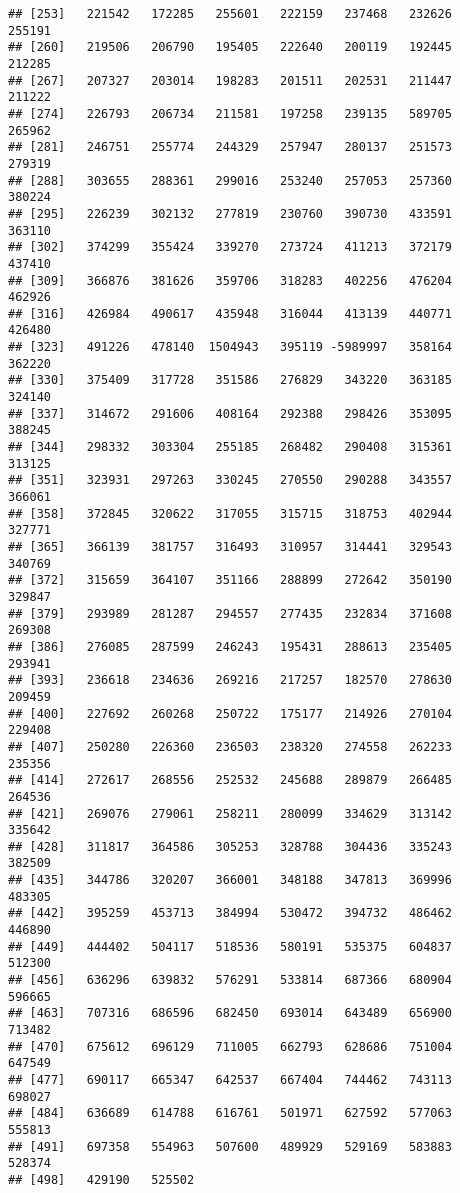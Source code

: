 \documentclass[]{article}
\begin{document}
\begin{verbatim}
## [253]   221542   172285   255601   222159   237468   232626   255191
## [260]   219506   206790   195405   222640   200119   192445   212285
## [267]   207327   203014   198283   201511   202531   211447   211222
## [274]   226793   206734   211581   197258   239135   589705   265962
## [281]   246751   255774   244329   257947   280137   251573   279319
## [288]   303655   288361   299016   253240   257053   257360   380224
## [295]   226239   302132   277819   230760   390730   433591   363110
## [302]   374299   355424   339270   273724   411213   372179   437410
## [309]   366876   381626   359706   318283   402256   476204   462926
## [316]   426984   490617   435948   316044   413139   440771   426480
## [323]   491226   478140  1504943   395119 -5989997   358164   362220
## [330]   375409   317728   351586   276829   343220   363185   324140
## [337]   314672   291606   408164   292388   298426   353095   388245
## [344]   298332   303304   255185   268482   290408   315361   313125
## [351]   323931   297263   330245   270550   290288   343557   366061
## [358]   372845   320622   317055   315715   318753   402944   327771
## [365]   366139   381757   316493   310957   314441   329543   340769
## [372]   315659   364107   351166   288899   272642   350190   329847
## [379]   293989   281287   294557   277435   232834   371608   269308
## [386]   276085   287599   246243   195431   288613   235405   293941
## [393]   236618   234636   269216   217257   182570   278630   209459
## [400]   227692   260268   250722   175177   214926   270104   229408
## [407]   250280   226360   236503   238320   274558   262233   235356
## [414]   272617   268556   252532   245688   289879   266485   264536
## [421]   269076   279061   258211   280099   334629   313142   335642
## [428]   311817   364586   305253   328788   304436   335243   382509
## [435]   344786   320207   366001   348188   347813   369996   483305
## [442]   395259   453713   384994   530472   394732   486462   446890
## [449]   444402   504117   518536   580191   535375   604837   512300
## [456]   636296   639832   576291   533814   687366   680904   596665
## [463]   707316   686596   682450   693014   643489   656900   713482
## [470]   675612   696129   711005   662793   628686   751004   647549
## [477]   690117   665347   642537   667404   744462   743113   698027
## [484]   636689   614788   616761   501971   627592   577063   555813
## [491]   697358   554963   507600   489929   529169   583883   528374
## [498]   429190   525502
\end{verbatim}
\end{document}
